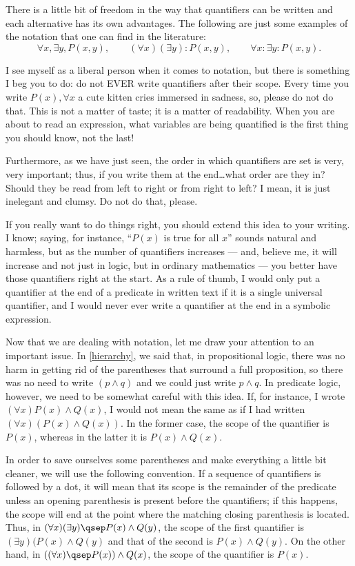\begin{para}[Notation]
\label{notaquan}
There is a little bit of freedom in the way that quantifiers can be written and each alternative has its own advantages. The following are just some examples of the notation that one can find in the literature:
\[ \forall x, \exists y, P(x,y),\qquad (\forall x)(\exists y) : P(x,y),\qquad \forall x : \exists y : P(x,y).\]

I see myself as a liberal person when it comes to notation, but there is something I beg you to do: do not EVER write quantifiers after their scope. Every time you write $P(x),\forall x$ a cute kitten cries immersed in sadness, so, please do not do that.
This is not a matter of taste; it is a matter of readability. When you are about to read an expression, what variables are being quantified is the first thing you should know, not the last!

Furthermore, as we have just seen, the order in which quantifiers are set is very, very important; thus, if you write them at the end\ldots what order are they in? Should they be read from left to right or from right to left? I mean, it is just inelegant and clumsy. Do not do that, please.

If you really want to do things right, you should extend this idea to your writing.
I know; saying, for instance, ``$P(x)$ is true for all $x$'' sounds natural and harmless, but as the number of quantifiers increases --- and, believe me, it will increase and not just in logic, but in ordinary mathematics --- you better have those quantifiers right at the start.
As a rule of thumb, I would only put a quantifier at the end of a predicate in written text if it is a single universal quantifier, and I would never ever write a quantifier at the end in a symbolic expression.


Now that we are dealing with notation, let me draw your attention to an important issue.
In \ref{hierarchy}, we said that, in propositional logic, there was no harm in getting rid of the parentheses that surround a full proposition, so there was no need to write $(p \land q)$ and we could just write $p\land q$.
In predicate logic, however, we need to be somewhat careful with this idea.
If, for instance, I wrote $(\forall x) P(x) \land Q(x)$, I would not mean the same as if I had written $(\forall x)(P(x) \land Q(x))$.
In the former case, the scope of the quantifier is $P(x)$, whereas in the latter it is $P(x)\land Q(x)$.

In order to save ourselves some parentheses and make everything a little bit cleaner, we will use the following convention.
If a sequence of quantifiers is followed by a dot, it will mean that its scope is the remainder of the predicate unless an opening parenthesis is present before the quantifiers; if this happens, the scope will end at the point where the matching closing parenthesis is located.
Thus, in $(\forall x)(\exists y)\qsep P(x)\land Q(y)$, the scope of the first quantifier is $(\exists y)(P(x) \land Q(y)$ and that of the second is $P(x) \land Q(y)$.
On the other hand, in $( (\forall x)\qsep P(x) ) \land Q(x)$, the scope of the quantifier is $P(x)$.
\end{para}


